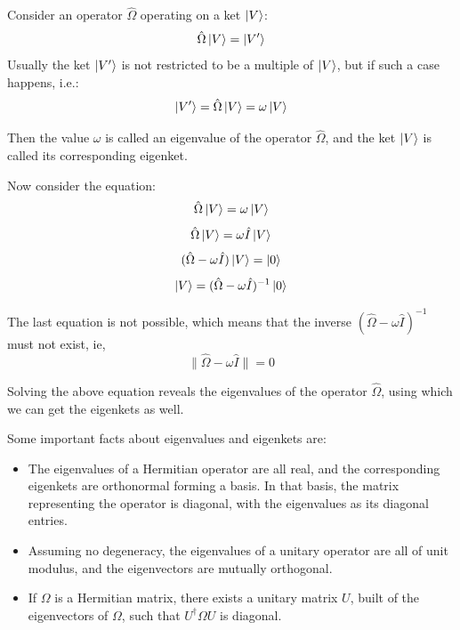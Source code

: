 \documentclass[12pt,a4paper]{report}
\begin{document}
Consider an operator $\hat{\Omega}$ operating on a ket $\ket{V}$:
\begin{equation*}
    \hat{\Omega}\ket{V} = \ket{V'}
\end{equation*}
Usually the ket $\ket{V'}$ is not restricted to be a multiple of $\ket{V}$, but if such a case happens, i.e.:
\begin{equation*}
    \ket{V'} = \hat{\Omega}\ket{V} = \omega\ket{V}
\end{equation*}

Then the value $\omega$ is called an eigenvalue of the operator $\hat{\Omega}$, and the ket $\ket{V}$ is called its corresponding eigenket.

Now consider the equation:
\begin{equation*}
    \hat{\Omega}\ket{V} = \omega\ket{V}
\end{equation*}
\begin{equation*}
    \hat{\Omega}\ket{V} = \omega\hat{I}\ket{V}
\end{equation*}
\begin{equation*}
    (\hat{\Omega}-\omega\hat{I})\ket{V} = \ket{0}
\end{equation*}
\begin{equation*}
    \ket{V} = (\hat{\Omega}-\omega\hat{I})^{-1}\ket{0}
\end{equation*}

The last equation is not possible, which means that the inverse $(\hat{\Omega}-\omega\hat{I})^{-1}$ must not exist, ie,
\begin{equation*}
    \|\hat{\Omega}-\omega\hat{I}\| = 0
\end{equation*}

Solving the above equation reveals the eigenvalues of the operator $\hat{\Omega}$, using which we can get the eigenkets as well.

Some important facts about eigenvalues and eigenkets are:
\begin{itemize}
    \item The eigenvalues of a Hermitian operator are all real, and the corresponding eigenkets are orthonormal forming a basis. In that basis, the matrix representing the operator is diagonal, with the eigenvalues as its diagonal entries.
    \item Assuming no degeneracy, the eigenvalues of a unitary operator are all of unit modulus, and the eigenvectors are mutually orthogonal.
    \item If $\Omega$ is a Hermitian matrix, there exists a unitary matrix $U$, built of the eigenvectors of $\Omega$, such that $U^\dagger\Omega U$ is diagonal.
\end{itemize}
\end{document}

